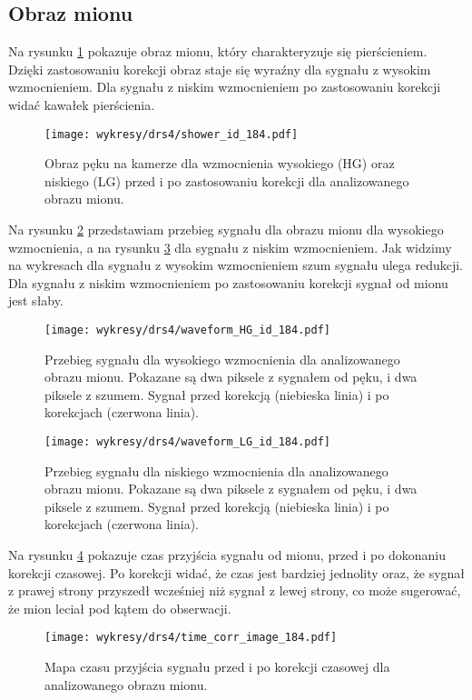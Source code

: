 \documentclass[a4paper,11pt,twoside]{article}
\begin{document}
\subsection{Obraz mionu}
Na rysunku \ref{fig:muon_image} pokazuje obraz mionu, który charakteryzuje się pierścieniem. Dzięki zastosowaniu korekcji obraz staje się wyraźny dla sygnału z wysokim wzmocnieniem. Dla sygnału z niskim wzmocnieniem po zastosowaniu korekcji widać kawałek pierścienia. 
\begin{figure}[H] 
\centering
\texttt{[image: wykresy/drs4/shower\_id\_184.pdf]}
\caption{Obraz pęku na kamerze dla wzmocnienia wysokiego (HG) oraz niskiego (LG) przed i po zastosowaniu korekcji dla analizowanego obrazu mionu.}
\label{fig:muon_image}
\end{figure}
\newpage
Na rysunku \ref{fig:waveform_muon_hg} przedstawiam przebieg sygnału dla obrazu mionu dla wysokiego wzmocnienia, a na rysunku \ref{fig:waveform_muon_lg} dla sygnału z niskim wzmocnieniem. Jak widzimy na wykresach dla sygnału z wysokim wzmocnieniem szum sygnału ulega redukcji. Dla sygnału z niskim wzmocnieniem po zastosowaniu korekcji sygnał od mionu jest słaby.
\begin{figure}[H] 
\centering
\texttt{[image: wykresy/drs4/waveform\_HG\_id\_184.pdf]}
\caption{Przebieg sygnału dla wysokiego wzmocnienia dla analizowanego obrazu mionu. Pokazane są dwa piksele z sygnałem od pęku, i dwa piksele z szumem. Sygnał przed korekcją (niebieska linia) i po korekcjach (czerwona linia).}
\label{fig:waveform_muon_hg}
\end{figure}

\begin{figure}[H] 
\centering
\texttt{[image: wykresy/drs4/waveform\_LG\_id\_184.pdf]}
\caption{Przebieg sygnału dla niskiego wzmocnienia dla analizowanego obrazu mionu. Pokazane są dwa piksele z sygnałem od pęku, i dwa piksele z szumem. Sygnał przed korekcją (niebieska linia) i po korekcjach (czerwona linia).}
\label{fig:waveform_muon_lg}
\end{figure}
\newpage
Na rysunku \ref{fig:time_corr_map_muon} pokazuje czas przyjścia sygnału od mionu, przed i po dokonaniu korekcji czasowej. Po korekcji widać, że czas jest bardziej jednolity oraz, że sygnał z prawej strony przyszedł wcześniej niż sygnał z lewej strony, co może sugerować, że mion leciał pod kątem do obserwacji. 
\begin{figure}[H] 
\centering
\texttt{[image: wykresy/drs4/time\_corr\_image\_184.pdf]}
\caption{Mapa czasu przyjścia sygnału przed i po korekcji czasowej dla analizowanego obrazu mionu.}
\label{fig:time_corr_map_muon}
\end{figure}
\newpage
\end{document}
